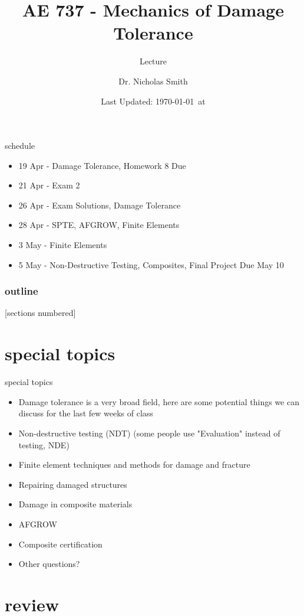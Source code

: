 \documentclass[10pt]{beamer}
\title{AE 737 - Mechanics of Damage Tolerance}
\subtitle{Lecture \arabic{lecture}}
\date{Last Updated: \today\ at \DTMcurrenttime}
\author{Dr. Nicholas Smith}
\institute{Wichita State University, Department of Aerospace Engineering}
\begin{document}
	
	\maketitle
	\begin{frame}{schedule}
		\begin{itemize}
			\item 19 Apr - Damage Tolerance, Homework 8 Due
			\item 21 Apr - Exam 2
			\item 26 Apr - Exam Solutions, Damage Tolerance
			\item 28 Apr - SPTE, AFGROW, Finite Elements
			\item 3 May - Finite Elements
			\item 5 May - Non-Destructive Testing, Composites, Final Project Due May 10
		\end{itemize}
	\end{frame}
	
	\begin{frame}
		\frametitle{outline}
		[sections numbered]
		\tableofcontents[hideallsubsections]
	\end{frame}

	\section{special topics}
	
	\begin{frame}{special topics}
		\begin{itemize}[<+->]
			\item Damage tolerance is a very broad field, here are some potential things we can discuss for the last few weeks of class
			\item Non-destructive testing (NDT) (some people use "Evaluation" instead of testing, NDE)
			\item Finite element techniques and methods for damage and fracture
			\item Repairing damaged structures
			\item Damage in composite materials
			\item AFGROW
			\item Composite certification 
			\item Other questions?
		\end{itemize}
	\end{frame}
	
	\section{review}
	
\end{document}
